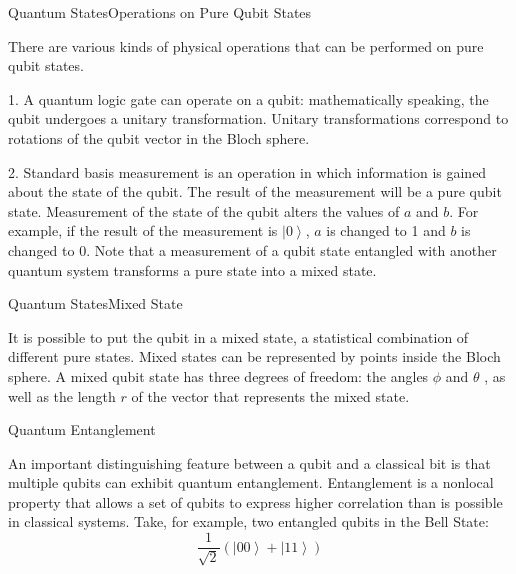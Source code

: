 \documentclass[beamer,serif]{beamer}
\begin{document}
\begin{frame}{Quantum States}{Operations on Pure Qubit States}
	\par There are various kinds of physical operations that can be performed on pure qubit states.
	\par 1. A quantum logic gate can operate on a qubit: mathematically speaking, the qubit undergoes a unitary transformation. Unitary transformations correspond to rotations of the qubit vector in the Bloch sphere.
	\par 2. Standard basis measurement is an operation in which information is gained about the state of the qubit. The result of the measurement will be a pure qubit state.  Measurement of the state of the qubit alters the values of $a$ and $b$. For example, if the result of the measurement is $\left|0\right\rangle$, $a$ is changed to 1 and $b$ is changed to 0. Note that a measurement of a qubit state entangled with another quantum system transforms a pure state into a mixed state.
\end{frame}

\begin{frame}{Quantum States}{Mixed State}
	\par It is possible to put the qubit in a mixed state, a statistical combination of different pure states. Mixed states can be represented by points inside the Bloch sphere. A mixed qubit state has three degrees of freedom: the angles $\phi$ and $\theta$ , as well as the length $r$ of the vector that represents the mixed state.
\end{frame}

\begin{frame}{Quantum Entanglement}{}
	\par An important distinguishing feature between a qubit and a classical bit is that multiple qubits can exhibit quantum entanglement. Entanglement is a nonlocal property that allows a set of qubits to express higher correlation than is possible in classical systems. Take, for example, two entangled qubits in the Bell State:
	\begin{equation}
		\dfrac{1}{\sqrt{2}}(\left|00\right\rangle+\left|11\right\rangle)
	\end {equation}	
\end{frame}
\end{document}
